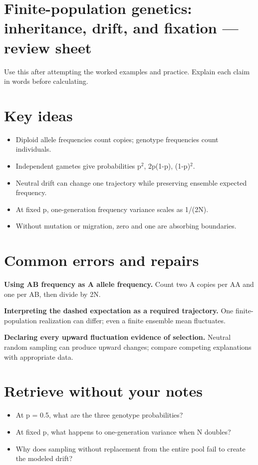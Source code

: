\documentclass[11pt,letterpaper]{article}
\theoremstyle{definition}\newtheorem{definition}{Definition}\newtheorem{example}{Example}
\numberwithin{equation}{section}
\begin{document}
\section*{Finite-population genetics: inheritance, drift, and fixation --- review sheet}
Use this after attempting the worked examples and practice. Explain each claim in words before calculating.

\section*{Key ideas}
\begin{itemize}
\item Diploid allele frequencies count copies; genotype frequencies count individuals.
\item Independent gametes give probabilities p$^2$, 2p(1-p), (1-p)$^2$.
\item Neutral drift can change one trajectory while preserving ensemble expected frequency.
\item At fixed p, one-generation frequency variance scales as 1/(2N).
\item Without mutation or migration, zero and one are absorbing boundaries.
\end{itemize}
\section*{Common errors and repairs}
\textbf{Using AB frequency as A allele frequency.} Count two A copies per AA and one per AB, then divide by 2N.

\textbf{Interpreting the dashed expectation as a required trajectory.} One finite-population realization can differ; even a finite ensemble mean fluctuates.

\textbf{Declaring every upward fluctuation evidence of selection.} Neutral random sampling can produce upward changes; compare competing explanations with appropriate data.

\section*{Retrieve without your notes}
\begin{itemize}
\item At p =\allowbreak{} 0.5, what are the three genotype probabilities?
\item At fixed p, what happens to one-generation variance when N doubles?
\item Why does sampling without replacement from the entire pool fail to create the modeled drift?
\end{itemize}
\end{document}
